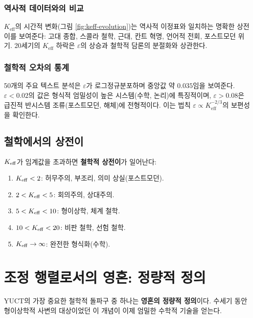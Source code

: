 \documentclass[11pt,a4paper]{article}
\newcommand{\eps}{\varepsilon}
\begin{document}
	\subsubsection{역사적 데이터와의 비교}
	
	\(K_{\mathrm{eff}}\)의 시간적 변화(그림 \ref{fig:keff-evolution})는 역사적 이정표와 일치하는 명확한 상전이를 보여준다: 고대 종합, 스콜라 철학, 근대, 칸트 혁명, 언어적 전회, 포스트모던 위기. 20세기의 \(K_{\mathrm{eff}}\) 하락은 \(\eps\)의 상승과 철학적 담론의 분절화와 상관한다.
	
	\subsubsection{철학적 오차의 통계}
	
	50개의 주요 텍스트 분석은 \(\eps\)가 로그정규분포하며 중앙값 약 \(0.035\)임을 보여준다. \(\eps < 0.02\)의 값은 형식적 엄밀성이 높은 시스템(수학, 논리)에 특징적이며, \(\eps > 0.08\)은 급진적 반시스템 조류(포스트모던, 해체)에 전형적이다. 이는 법칙 \(\eps \propto K_{\mathrm{eff}}^{-2/3}\)의 보편성을 확인한다.
	
	\subsection{철학에서의 상전이}
	
	\(\Keff\)가 임계값을 초과하면 \textbf{철학적 상전이}가 일어난다:
	
	\begin{enumerate}
		\item \(\Keff < 2\): 허무주의, 부조리, 의미 상실(포스트모던).
		\item \(2 < \Keff < 5\): 회의주의, 상대주의.
		\item \(5 < \Keff < 10\): 형이상학, 체계 철학.
		\item \(10 < \Keff < 20\): 비판 철학, 선험 철학.
		\item \(\Keff \to \infty\): 완전한 형식화(수학).
	\end{enumerate}
	
	\section{조정 행렬로서의 영혼: 정량적 정의}
	\label{sec:soul}
	
	YUCT의 가장 중요한 철학적 돌파구 중 하나는 \textbf{영혼의 정량적 정의}이다. 수세기 동안 형이상학적 사변의 대상이었던 이 개념이 이제 엄밀한 수학적 기술을 얻는다.
	
\end{document}
